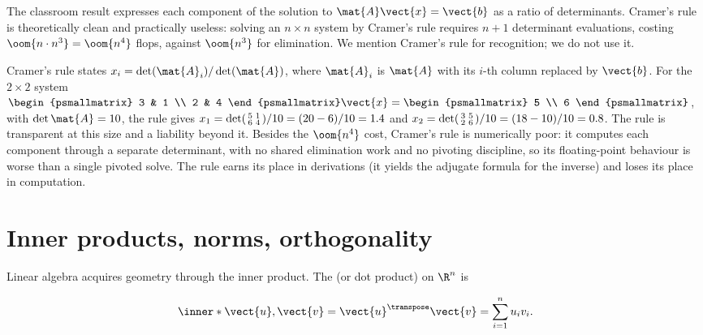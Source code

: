 The classroom result  expresses each
component of the solution to $\mat{A}\vect{x} = \vect{b}$ as a
ratio of determinants. Cramer's rule is theoretically clean and
practically useless: solving an $n \times n$ system by Cramer's
rule requires $n + 1$ determinant evaluations, costing
$\oom{n \cdot n^{3}} = \oom{n^{4}}$ flops, against $\oom{n^{3}}$
for elimination. We mention Cramer's rule for recognition; we do
not use it.

\begin{mastery}
Cramer's rule states $x_{i} = \det(\mat{A}_{i})/\det(\mat{A})$,
where $\mat{A}_{i}$ is $\mat{A}$ with its $i$-th column replaced by
$\vect{b}$. For the $2 \times 2$ system $\begin{psmallmatrix} 3 & 1
\\ 2 & 4 \end{psmallmatrix}\vect{x} = \begin{psmallmatrix} 5 \\ 6
\end{psmallmatrix}$, with $\det \mat{A} = 10$, the rule gives $x_{1}
= \det\begin{psmallmatrix} 5 & 1 \\ 6 & 4 \end{psmallmatrix}/10 =
(20 - 6)/10 = 1.4$ and $x_{2} = \det\begin{psmallmatrix} 3 & 5 \\ 2
& 6 \end{psmallmatrix}/10 = (18 - 10)/10 = 0.8$. The rule is
transparent at this size and a liability beyond it. Besides the
$\oom{n^{4}}$ cost, Cramer's rule is numerically poor: it computes
each component through a separate determinant, with no shared
elimination work and no pivoting discipline, so its floating-point
behaviour is worse than a single pivoted solve. The rule earns its
place in derivations (it yields the adjugate formula for the
inverse) and loses its place in computation.
\end{mastery}

\section{Inner products, norms, orthogonality}

Linear algebra acquires geometry through the inner product. The
 (or dot product) on $\R^{n}$ is

\[
\inner*{\vect{u}, \vect{v}} = \vect{u}^{\transpose} \vect{v}
= \sum_{i=1}^{n} u_{i} v_{i}.
\]

